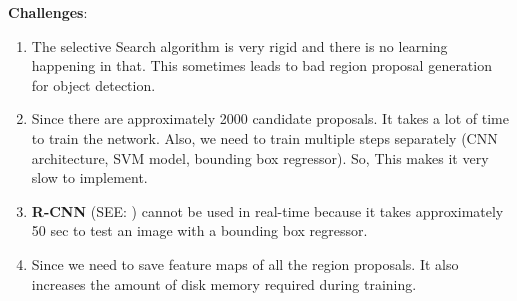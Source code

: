 \vspace{0.2cm}
\textbf{Challenges}:
\begin{enumerate}
    \item The selective Search algorithm is very rigid and there is no learning happening in that. This sometimes leads to bad region proposal generation for object detection.

    \item Since there are approximately 2000 candidate proposals. It takes a lot of time to train the network. Also, we need to train multiple steps separately (CNN architecture, SVM model, bounding box regressor). So, This makes it very slow to implement.

    \item \textbf{R-CNN} (SEE: ) cannot be used in real-time because it takes approximately 50 sec to test an image with a bounding box regressor.

    \item Since we need to save feature maps of all the region proposals. It also increases the amount of disk memory required during training.
\end{enumerate}
































